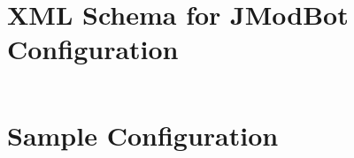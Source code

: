 \documentclass{report}
\begin{document}
	\chapter{XML Schema for JModBot Configuration}
	\inputminted[linenos]{xml}{config.xsd}
	\chapter{Sample Configuration}
	\inputminted[linenos]{xml}{bot.sample.xml}
\end{document}
